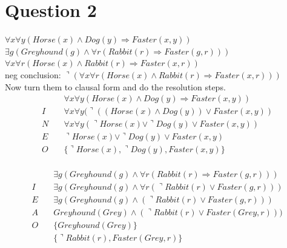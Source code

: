 \documentclass[letterpaper, 12pt]{artikel3}
\begin{document}
\section*{Question 2}

$\forall x \forall y (Horse(x) \land Dog(y) \Rightarrow Faster(x,y))$\\
$\exists g (Greyhound(g) \land \forall r (Rabbit(r) \Rightarrow Faster(g,r)))$\\
$\forall x  \forall r  (Horse(x) \land Rabbit(r) \Rightarrow  Faster(x,r))$\\
neg conclusion: $ \urcorner (\forall x  \forall r  (Horse(x) \land Rabbit(r) \Rightarrow  Faster(x,r)))$\\
Now turn them to clausal form and do the resolution steps.\\
\begin{align*}
&\forall x \forall y (Horse(x) \land Dog(y) \Rightarrow Faster(x,y))\\
I \quad & \forall x \forall y  (\urcorner ((Horse(x) \land Dog(y))  \lor Faster(x,y) )\\
N \quad & \forall x \forall y (\urcorner Horse(x) \lor \urcorner Dog(y) \lor Faster(x,y)) \\
E \quad & \urcorner Horse(x) \lor \urcorner Dog(y) \lor Faster(x,y)\\
O \quad & \{ \urcorner Horse(x), \urcorner Dog(y), Faster(x,y) \}\\
\end{align*}

\begin{align*}
& \exists g (Greyhound(g) \land \forall r (Rabbit(r) \Rightarrow Faster(g,r)))\\
I \quad & \exists g (Greyhound(g) \land \forall r (\urcorner Rabbit(r) \lor  Faster(g,r)))\\
E \quad &  \exists g (Greyhound(g) \land (\urcorner Rabbit(r) \lor  Faster(g,r)))\\
A \quad &  Greyhound(Grey) \land (\urcorner Rabbit(r) \lor  Faster(Grey,r)))\\
O \quad & \{Greyhound(Grey)\}\\
\quad & \{\urcorner Rabbit(r),Faster(Grey,r)\}\\
\end{align*}
\end{document}
